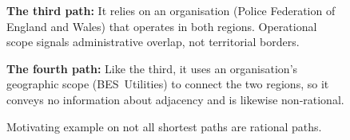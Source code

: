 \begin{figure}[t]
\begin{tcolorbox}[colback=gray!5!white,
                  colframe=gray!75!black,
                  title=WebQTest-923\_e3a2d3d50bac69d563de83a7f72eafc0]
{\textbf{The third path:} It relies on an organisation (Police Federation of
England and Wales) that operates in both regions.  Operational scope
signals administrative overlap, not territorial borders.\par\vspace{6pt}

\textbf{The fourth path:} Like the third, it uses an organisation’s
geographic scope (BES Utilities) to connect the two regions, so it conveys
no information about adjacency and is likewise non‑rational.\par}

\end{tcolorbox}
\caption{Motivating example on not all shortest paths are rational paths.}
\label{fig:type1_no1}
\end{figure}

